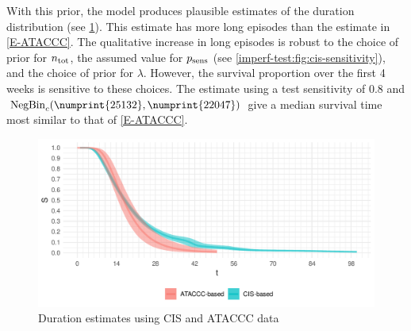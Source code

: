 \documentclass[thesis.tex]{subfiles}
\begin{document}
With this prior, the model produces plausible estimates of the duration distribution (see \cref{imperf-test:fig:cis-estimates}).
This estimate has more long episodes than the estimate in \cref{E-ATACCC}.
The qualitative increase in long episodes is robust to the choice of prior for $n_\text{tot}$, the assumed value for $p_\text{sens}$ (see \cref{imperf-test:fig:cis-sensitivity}), and the choice of prior for $\lambda$.
However, the survival proportion over the first 4 weeks is sensitive to these choices.
The estimate using a test sensitivity of 0.8 and $\NBc(\numprint{25132}, \numprint{22047})$ give a median survival time most similar to that of \cref{E-ATACCC}.
\begin{figure}
  \centering \includegraphics{cis-imperfect-testing/CIS_final}
  \caption{Duration estimates using CIS and ATACCC data}
  \label{imperf-test:fig:cis-estimates}
\end{figure}
\end{document}
